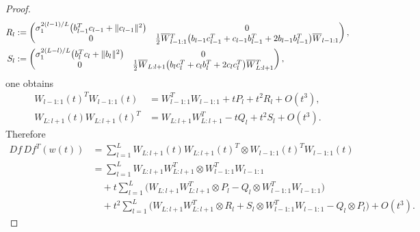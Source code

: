 \documentclass{article}
\newcommand{\bW}{\smash{\overline{W}}\vphantom{W}}
\theoremstyle{plain}
\theoremstyle{definition}
\theoremstyle{remark}
\begin{document}
\begin{proof}
\begin{align}
    R_l&:=
    \begin{pmatrix}
    \sigma_1^{2(l-1)/L}\big(b_{l-1}^Tc_{l-1}+\|c_{l-1}\|^2\big) & 0\\
    0 & \frac12\bW_{l-1:1}^T\big(b_{l-1}c_{l-1}^T+c_{l-1}b_{l-1}^T+2b_{l-1}b_{l-1}^T\big)\bW_{l-1:1}
    \end{pmatrix},
    \\
    S_l&:=
    \begin{pmatrix}
    \sigma_1^{2(L-l)/L}\big(b_l^Tc_l+\|b_l\|^2\big) & 0\\
    0 & \frac12\bW_{L:l+1}\big(b_lc_l^T+c_lb_l^T+2c_lc_l^T\big)\bW_{L:l+1}^T
    \end{pmatrix},
    \end{align}
    one obtains
    \begin{align}
    W_{l-1:1}(t)^TW_{l-1:1}(t)
    &=
    W_{l-1:1}^TW_{l-1:1}
    +tP_l+t^2R_l+O(t^3),
    \\
    W_{L:l+1}(t)W_{L:l+1}(t)^T
    &=
    W_{L:l+1}W_{L:l+1}^T
    -tQ_l+t^2S_l+O(t^3).
    \end{align}
    Therefore
    \begin{align}
    Df\,Df^T(w(t))
    &=
    \sum_{l=1}^L W_{L:l+1}(t)W_{L:l+1}(t)^T\otimes W_{l-1:1}(t)^TW_{l-1:1}(t)
    \\
    &=
    \sum_{l=1}^L W_{L:l+1}W_{L:l+1}^T\otimes W_{l-1:1}^TW_{l-1:1}
    \\
    &\quad
    +t\sum_{l=1}^L\Big(
    W_{L:l+1}W_{L:l+1}^T\otimes P_l
    -
    Q_l\otimes W_{l-1:1}^TW_{l-1:1}
    \Big)
    \\
    &\quad
    +t^2\sum_{l=1}^L\Big(
    W_{L:l+1}W_{L:l+1}^T\otimes R_l
    +
    S_l\otimes W_{l-1:1}^TW_{l-1:1}
    -
    Q_l\otimes P_l
    \Big)
    +O(t^3).
    \end{align}
    

\end{proof}
\end{document}
